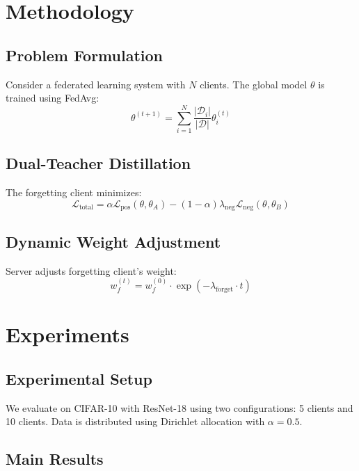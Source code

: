 \documentclass[11pt,a4paper]{article}
\begin{document}
\section{Methodology}

\subsection{Problem Formulation}

Consider a federated learning system with $N$ clients. The global model $\theta$ is trained using FedAvg:
\begin{equation}
\theta^{(t+1)} = \sum_{i=1}^{N} \frac{|\mathcal{D}_i|}{|\mathcal{D}|} \theta_i^{(t)}
\end{equation}

\subsection{Dual-Teacher Distillation}

The forgetting client minimizes:
\begin{equation}
\mathcal{L}_{\text{total}} = \alpha \mathcal{L}_{\text{pos}}(\theta, \theta_A) - (1-\alpha) \lambda_{\text{neg}} \mathcal{L}_{\text{neg}}(\theta, \theta_B)
\end{equation}

\subsection{Dynamic Weight Adjustment}

Server adjusts forgetting client's weight:
\begin{equation}
w_f^{(t)} = w_f^{(0)} \cdot \exp(-\lambda_{\text{forget}} \cdot t)
\end{equation}

\section{Experiments}

\subsection{Experimental Setup}

We evaluate on CIFAR-10 with ResNet-18 using two configurations: 5 clients and 10 clients. Data is distributed using Dirichlet allocation with $\alpha=0.5$.

\subsection{Main Results}
\end{document}
